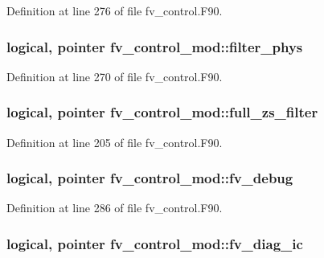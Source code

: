 Definition at line 276 of file fv\-\_\-control.\-F90.

\subsubsection[{filter\-\_\-phys}]{\setlength{\rightskip}{0pt plus 5cm}logical, pointer fv\-\_\-control\-\_\-mod\-::filter\-\_\-phys\hspace{0.3cm}{\ttfamily [private]}}\label{classfv__control__mod_a09465ea27767a03eabece8b1c3bed623}


Definition at line 270 of file fv\-\_\-control.\-F90.

\subsubsection[{full\-\_\-zs\-\_\-filter}]{\setlength{\rightskip}{0pt plus 5cm}logical, pointer fv\-\_\-control\-\_\-mod\-::full\-\_\-zs\-\_\-filter\hspace{0.3cm}{\ttfamily [private]}}\label{classfv__control__mod_a1dfb700af3f7669f0629f42a68ba042f}


Definition at line 205 of file fv\-\_\-control.\-F90.

\subsubsection[{fv\-\_\-debug}]{\setlength{\rightskip}{0pt plus 5cm}logical, pointer fv\-\_\-control\-\_\-mod\-::fv\-\_\-debug\hspace{0.3cm}{\ttfamily [private]}}\label{classfv__control__mod_a7c3504459e1540c0d6360d992b484fda}


Definition at line 286 of file fv\-\_\-control.\-F90.

\subsubsection[{fv\-\_\-diag\-\_\-ic}]{\setlength{\rightskip}{0pt plus 5cm}logical, pointer fv\-\_\-control\-\_\-mod\-::fv\-\_\-diag\-\_\-ic\hspace{0.3cm}{\ttfamily [private]}}\label{classfv__control__mod_ac1952fa035cb6a71f7a72eb765c36ca6}


